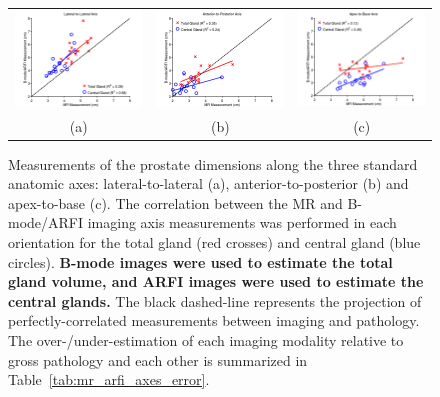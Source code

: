\begin{figure}
\centering
\begin{tabular}{ccc}
\includegraphics[width=0.3\linewidth]{figs/Imaging_Lateral-to-Lateral} &
\includegraphics[width=0.3\linewidth]{figs/Imaging_Anterior-to-Posterior} &
\includegraphics[width=0.3\linewidth]{figs/Imaging_Apex-to-Base} \\
(a) & (b) & (c) \\
\end{tabular}
\caption{Measurements of the prostate dimensions along the three standard
    anatomic axes: lateral-to-lateral (a), anterior-to-posterior (b) and
    apex-to-base (c).  The correlation between the MR and B-mode/ARFI imaging
    axis measurements was performed in each orientation for the total gland
    (red crosses) and central gland (blue circles).  \textbf{B-mode images were
        used to estimate the total gland volume, and ARFI images were used to
        estimate the central glands.} The black dashed-line represents the
    projection of perfectly-correlated measurements between imaging and
    pathology.  The over-/under-estimation of each imaging modality relative to
    gross pathology and each other is summarized in
    Table~\ref{tab:mr_arfi_axes_error}.} 
\label{fig:mr_arfi_path_axes}
\end{figure}
